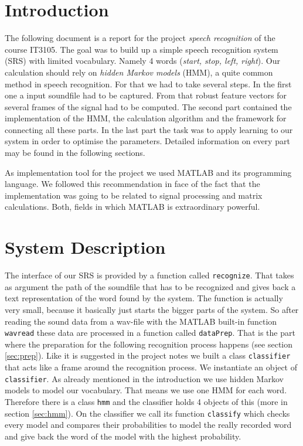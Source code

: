 \documentclass[titlepage]{article}
\begin{document}

\section{Introduction}
The following document is a report for the project \emph{speech recognition} of the course IT3105. The goal was to build up a simple speech recognition system (SRS) with limited vocabulary. Namely 4 words (\emph{start, stop, left, right}). Our calculation should rely on \emph{hidden Markov models} (HMM), a quite common method in speech recognition. For that we had to take several steps. In the first one a input soundfile had to be captured. From that robust feature vectors for several frames of the signal had to be computed. The second part contained the implementation of the HMM, the calculation algorithm and the framework for connecting all these parts. In the last part the task was to apply learning to our system in order to optimise the parameters. Detailed information on every part may be found in the following sections.

As implementation tool for the project we used MATLAB and its programming language. We followed this recommendation in face of the fact that the implementation was going to be related to signal processing and matrix calculations. Both, fields in which MATLAB is extraordinary powerful.

\section{System Description}\label{sec:system}
The interface of our SRS is provided by a function called \lstinline&recognize&. That takes as argument the path of the soundfile that has to be recognized and gives back a text representation of the word found by the system. The function is actually very small, because it basically just starts the bigger parts of the system. So after reading the sound data from a wav-file with the MATLAB built-in function \lstinline&wavread& these data are processed in a function called \lstinline&dataPrep&. That is the part where the preparation for the following recognition process happens (see section \ref{sec:prep}).
Like it is suggested in the project notes we built a class \lstinline&classifier& that acts like a frame around the recognition process. We instantiate an object of \lstinline&classifier&. As already mentioned in the introduction we use hidden Markov models to model our vocabulary. That means we use one HMM for each word. Therefore there is a class \lstinline&hmm& and the classifier holds 4 objects of this (more in section \ref{sec:hmm}). On the classifier we call its function \lstinline&classify& which checks every model and compares their probabilities to model the really recorded word and give back the word of the model with the highest probability.
\end{document}
